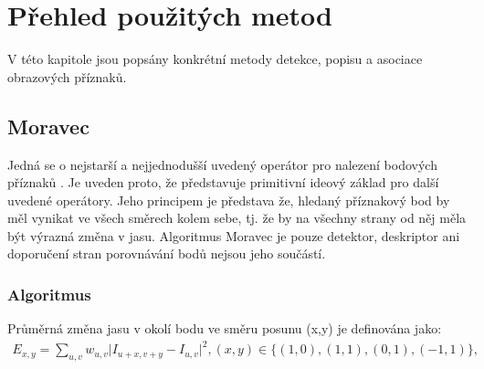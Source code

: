 


\chapter{Přehled použitých metod}

V této kapitole jsou popsány konkrétní metody detekce, popisu a asociace obrazových příznaků.

\section{Moravec}

Jedná se o nejstarší a nejjednodušší uvedený operátor pro nalezení bodových příznaků \cite{moravec1980obstacle}. Je uveden proto, že představuje primitivní ideový základ pro další uvedené operátory. Jeho principem je představa že, hledaný příznakový bod by měl vynikat ve všech směrech kolem sebe, tj. že by na všechny strany od něj měla být výrazná změna v jasu. Algoritmus Moravec je pouze detektor, deskriptor ani doporučení stran porovnávání bodů nejsou jeho součástí.

\subsection{Algoritmus}

Průměrná změna jasu v okolí bodu ve směru posunu (x,y) je definována jako:
\begin{align}	
E_{x,y} = \sum_{u,v} w_{u,v} \lvert I_{u+x, v+y} - I_{u,v} \rvert^2 , (x,y) \in \{(1,0), (1,1), (0,1), (-1,1)\},
\end{align}

